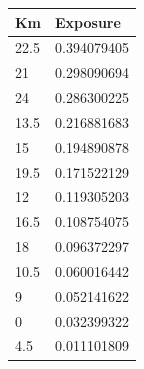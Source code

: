 \begin{longtable}{|l|l|}
	\centering
	\rowcolor[HTML]{9B9B9B} \textbf{Km} & \textbf{Exposure} \\ \hline
	\rowcolor[HTML]{F8FF00} 
	22.5                                                    & 0.394079405                                                   \\
	\rowcolor[HTML]{F8FF00} 
	21                                                      & 0.298090694                                                   \\
	\rowcolor[HTML]{F8FF00} 
	24                                                      & 0.286300225                                                   \\
	\rowcolor[HTML]{F8FF00} 
	13.5                                                    & 0.216881683                                                   \\
	\rowcolor[HTML]{32CB00} 
	15                                                      & 0.194890878                                                   \\
	\rowcolor[HTML]{32CB00} 
	19.5                                                    & 0.171522129                                                   \\
	\rowcolor[HTML]{32CB00} 
	12                                                      & 0.119305203                                                   \\
	\rowcolor[HTML]{32CB00} 
	16.5                                                    & 0.108754075                                                   \\
	\rowcolor[HTML]{32CB00} 
	18                                                      & 0.096372297                                                   \\
	\rowcolor[HTML]{32CB00} 
	10.5                                                    & 0.060016442                                                   \\
	\rowcolor[HTML]{32CB00} 
	9                                                       & 0.052141622                                                   \\
	\rowcolor[HTML]{32CB00} 
	0                                                       & 0.032399322                                                   \\
	\rowcolor[HTML]{32CB00} 
	4.5                                                     & 0.011101809                                                   \\

\end{longtable}
